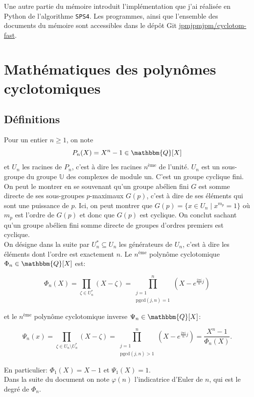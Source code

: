 \documentclass{article}
\newcommand{\Q}{\mathbbm{Q}}
\newcommand{\pgcd}{\mathrm{pgcd}}
\theoremstyle{break}                  %
\begin{document}
Une autre partie du mémoire introduit l'implémentation que j'ai réalisée en Python de l'algorithme \texttt{SPS4}. Les programmes, ainsi que l'ensemble des documents du mémoire sont accessibles dans le dépôt Git \href{https://github.com/jpmjpmjpm/cyclotom-fast}{jpmjpmjpm/cyclotom-fast}.



\section*{Mathématiques des polynômes cyclotomiques}
\subsection*{Définitions}
Pour un entier $n \ge 1$, on note $$P_n(X) = X^n - 1 \in \Q[X]$$ et $U_n$ les racines de $P_n$, c'est à dire les racines $n^{\text{ème}}$ de l'unité. $U_n$ est un sous-groupe du groupe $\mathbb U$ des complexes de module un. C'est un groupe cyclique fini. On peut le montrer en se souvenant qu'un groupe abélien fini $G$ est somme directe de ses sous-groupes $p$-maximaux $G(p)$, c'est à dire de ses éléments qui sont une puissance de $p$. Ici, on peut montrer que $G(p) = \{x \in U_n \mid x^{m_p} = 1\}$ où $m_p$ est l'ordre de $G(p)$ et donc que $G(p)$ est cyclique. On conclut sachant qu'un groupe abélien fini somme directe de groupes d'ordres premiers est cyclique.\\


On désigne dans la suite par $U_n^* \subseteq U_n$ les générateurs de $U_n$, c'est à dire les éléments dont l'ordre est exactement $n$. Le $n^{\text{ème}}$ polynôme cyclotomique $\Phi_n \in \Q[X]$ est:

$$\Phi_n(X) = \prod_{\zeta \in U^*_n} (X - \zeta) = \prod_{\substack{j=1\\ \pgcd(j,n)=1}}^n (X - e^{\frac{2 \pi i}{n}j})$$

et le $n^{\text{ème}}$ polynôme cyclotomique inverse $\Psi_n \in \Q[X]$:

$$\Psi_n(x) = \prod_{\zeta \in U_n \setminus U^*_n} (X - \zeta) = \prod_{\substack{j=1\\ \pgcd(j,n) > 1}}^n (X - e^{\frac{2 \pi i}{n}j}) = \frac{X^n - 1}{\Phi_n(X)}.$$

En particulier: $\Phi_1(X) = X-1$ et $\Psi_1(X) = 1$.\\


Dans la suite du document on note $\varphi(n)$ l'indicatrice d'Euler de $n$, qui est le degré de $\Phi_n$.
\end{document}
